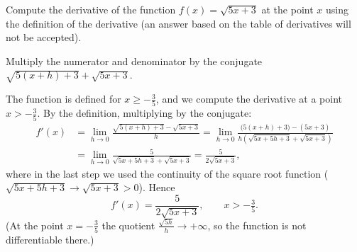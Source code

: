 
\begin{question}
Compute the derivative of the function $f(x)=\sqrt{5x+3}$ at the point $x$ using the definition of the derivative (an answer based on the table of derivatives will not be accepted).
\end{question}

\begin{hint}
Multiply the numerator and denominator by the conjugate $\sqrt{5(x+h)+3}+\sqrt{5x+3}$.
\end{hint}

\begin{solution}
The function is defined for $x\ge -\tfrac35$, and we compute the derivative at a point $x>-\tfrac35$. By the definition, multiplying by the conjugate:
\begin{align*}
f'(x)&=\lim_{h\to0}\frac{\sqrt{5(x+h)+3}-\sqrt{5x+3}}{h}
=\lim_{h\to0}\frac{\big(5(x+h)+3\big)-(5x+3)}{h\left(\sqrt{5x+5h+3}+\sqrt{5x+3}\right)}\\
&=\lim_{h\to0}\frac{5}{\sqrt{5x+5h+3}+\sqrt{5x+3}}=\frac{5}{2\sqrt{5x+3}},
\end{align*}
where in the last step we used the continuity of the square root function ($\sqrt{5x+5h+3}\to\sqrt{5x+3}>0$). Hence
\[ f'(x)=\frac{5}{2\sqrt{5x+3}},\qquad x>-\tfrac35. \]
(At the point $x=-\tfrac35$ the quotient $\frac{\sqrt{5h}}{h}\to+\infty$, so the function is not differentiable there.)
\end{solution}
